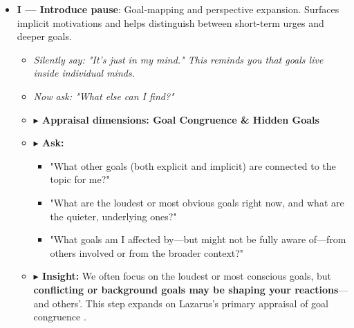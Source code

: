 \documentclass{article}
\begin{document}
\begin{itemize}[noitemsep,topsep=0pt]
    \item \textbf{I — Introduce pause}: Goal-mapping and perspective expansion. Surfaces implicit motivations and helps distinguish between short-term urges and deeper goals.
    \begin{itemize}[noitemsep,topsep=0pt]
        \item \textit{Silently say: "It's just in my mind." This reminds you that goals live inside individual minds.}
        \item \textit{Now ask: "What else can I find?"}
        \item \textbf{$\blacktriangleright$ Appraisal dimensions: Goal Congruence \& Hidden Goals}
        \item \textbf{$\blacktriangleright$ Ask:}
        \begin{itemize}[noitemsep,topsep=0pt]
            \item "What other goals (both explicit and implicit) are connected to the topic for me?"
            \item "What are the loudest or most obvious goals right now, and what are the quieter, underlying ones?"
            \item "What goals am I affected by—but might not be fully aware of—from others involved or from the broader context?"
        \end{itemize}
        \item \textbf{$\blacktriangleright$ Insight:} We often focus on the loudest or most conscious goals, but \textbf{conflicting or background goals may be shaping your reactions}—and others'. This step expands on Lazarus's primary appraisal of goal congruence \cite{lazarus1984stress}.
    \end{itemize}


\end{itemize}
\end{document}
